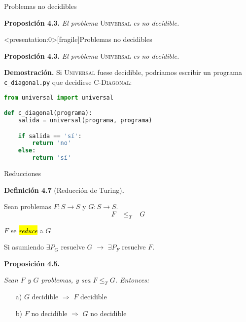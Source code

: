 \documentclass[10pt,xcolor=dvipsnames,aspectratio=169,spanish]{beamer}
\makeatletter
\let\HL\hl
\renewcommand\hl{%
  \let\set@color\beamerorig@set@color
  \let\reset@color\beamerorig@reset@color
  \HL}
\newcommand{\hle}[1]{\hl{\emph{#1}}}
\makeatother
\begin{document}
\begin{frame}[fragile]{Problemas no decidibles}

\textbf{Proposición 4.3.} \emph{El problema} \textsc{Universal} \emph{es no decidible.}

\end{frame}


\begin{frame}<presentation:0>[fragile]{Problemas no decidibles}

\textbf{Proposición 4.3.} \emph{El problema} \textsc{Universal} \emph{es no decidible.}

\textbf{Demostración.} Si \textsc{Universal} fuese decidible, podríamos escribir un programa \texttt{c\_diagonal.py} que decidiese \textsc{C-Diagonal}:

\begin{lstlisting}[language=Python]
from universal import universal

def c_diagonal(programa):
    salida = universal(programa, programa)

    if salida == 'sí':
        return 'no'
    else:
        return 'sí'
\end{lstlisting}
 \vspace{-8.5mm}

\hfill\square

\end{frame}

\begin{frame}{Reducciones}

\textbf{Definición 4.7} (Reducción de Turing)\textbf{.}

Sean problemas $F:S\longrightarrow S$ y $G:S\longrightarrow S$.
{\Large $$F \;\;\; \leq_T \;\;\; G$$}
\begin{center}
\vspace*{-2mm}
    $F$ se \hle{reduce} a $G$
\end{center}
Si asumiendo $\exists P_G$ resuelve $G$ $\rightarrow$ $\exists P_F$ resuelve $F$.

\vspace{5mm}

\pause

\textbf{Proposición 4.5.} {\itshape Sean $F$ y $G$ problemas, y sea $F\leq_T G$. Entonces:
\begin{itemize}
    \item[a)] $G$ decidible $\Rightarrow$ $F$ decidible
    \item[b)] $F$ no decidible $\Rightarrow$ $G$ no decidible
\end{itemize}}

\end{frame}
\end{document}
